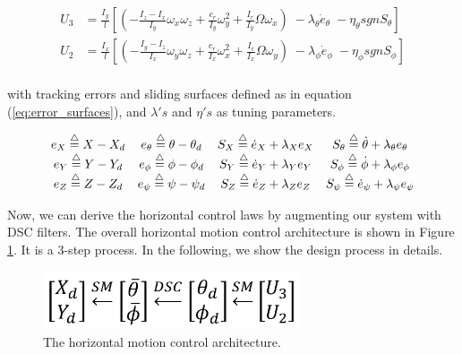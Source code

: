 \documentclass[journal,11pt,onecolumn,draftclsnofoot,]{IEEEtran}
\begin{document}
\begin{equation}
\label{eq:U2_3}
\begin{split}
U_3 &= \frac{I_y}{l}\left[ \left( -\frac{I_z-I_x}{I_y} \omega_x \omega_z + \frac{c_r}{I_y} \omega_y^2 + \frac{I_r}{I_y} \Omega \omega_x \right)\; - \lambda_\theta \dot{e}_\theta \; - \eta_\theta sgn S_\theta \right] \\
U_2 &= \frac{I_x}{l}\left[ \left( -\frac{I_y-I_z}{I_x} \omega_y \omega_z + \frac{c_r}{I_x} \omega_x^2 + \frac{I_r}{I_x} \Omega \omega_y \right)\; - \lambda_\phi \dot{e}_\phi \; - \eta_\phi sgn S_\phi \right] \\
\end{split}
\end{equation}

with tracking errors and sliding surfaces defined as in equation (\ref{eq:error_surfaces}), and $\lambda's$ and $\eta's$ as tuning parameters.

\begin{equation}
\label{eq:error_surfaces}
\begin{split}
\begin{matrix}
e_X \buildrel\triangle\over = X-X_d  & e_\theta \buildrel\triangle\over = \theta - \theta_d & S_X \buildrel\triangle\over = \dot{e}_X + \lambda_X e_X & S_\theta \buildrel\triangle\over = \dot{\theta} + \lambda_\theta e_\theta \\
e_Y \buildrel\triangle\over = Y-Y_d & e_\phi \buildrel\triangle\over = \phi - \phi_d  & S_Y \buildrel\triangle\over = \dot{e}_Y + \lambda_Y e_Y & S_\phi \buildrel\triangle\over = \dot{\phi} + \lambda_\phi e_\phi \\
e_Z \buildrel\triangle\over = Z-Z_d & e_\psi \buildrel\triangle\over = \psi-\psi_d & S_Z \buildrel\triangle\over = \dot{e}_Z + \lambda_Z e_Z & S_\psi \buildrel\triangle\over = \dot{e}_\psi + \lambda_\psi e_\psi \\
\end{matrix}
\end{split}
\end{equation}

Now, we can derive the horizontal control laws by augmenting our system with DSC filters. The overall horizontal motion control architecture is shown in Figure \ref{fig:horiz_ctrls}. It is a 3-step process. In the following, we show the design process in details.

\begin{figure}[thpb]
	\centering
	\includegraphics[width=3.0in]{horiz_ctrl}
	\caption{The horizontal motion control architecture.}
	\label{fig:horiz_ctrls}
\end{figure}
\end{document}
